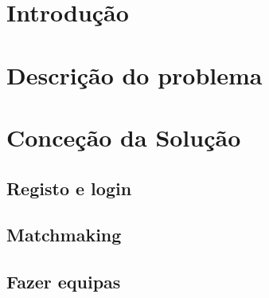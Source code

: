 \documentclass[a4paper]{article}
\begin{document}
\begin{abstract}

\hspace{3mm} 

\end{abstract}

\pagebreak
\tableofcontents

\pagebreak
\section{Introdução}
\label{sec:1}

\hspace{3mm} 




\pagebreak
\section{Descrição do problema}
\label{sec:2}

\hspace{3mm}


\pagebreak
\clearpage

\section{Conceção da Solução}
\label{sec:3}

\subsection{Registo e login}

\hspace{3mm} 



\subsection{Matchmaking}

\hspace{3mm} 




\subsection{Fazer equipas}

\hspace{3mm} 
\end{document}
